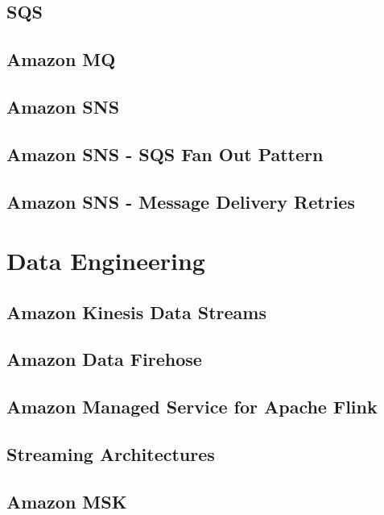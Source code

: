 \documentclass[11pt]{book}
\begin{document}
    \section{SQS}


    \section{Amazon MQ}


    \section{Amazon SNS}


    \section{Amazon SNS - SQS Fan Out Pattern}


    \section{Amazon SNS - Message Delivery Retries}


    \chapter{Data Engineering}


    \section{Amazon Kinesis Data Streams}


    \section{Amazon Data Firehose}


    \section{Amazon Managed Service for Apache Flink}


    \section{Streaming Architectures}


    \section{Amazon MSK}
\end{document}
